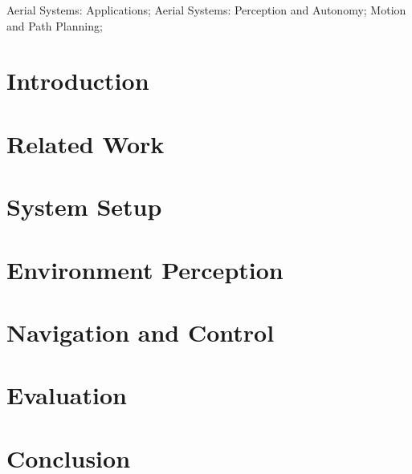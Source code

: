 \documentclass[letterpaper, 10 pt, journal, twoside]{IEEEtran}
\begin{document}
\begin{IEEEkeywords}
Aerial Systems: Applications; Aerial Systems: Perception and Autonomy; Motion and Path Planning;
\end{IEEEkeywords}

\section{Introduction}
\label{sec:Introduction}


\section{Related Work}
\label{sec:Related_Work}


\section{System Setup}
\label{sec:System_Setup}


\section{Environment Perception}
\label{sec:Environment_Perception}


\section{Navigation and Control}
\label{sec:Navigation_and_Control}


\section{Evaluation}
\label{sec:Evaluation}


\section{Conclusion}
\label{sec:Conclusion}





\end{document}
